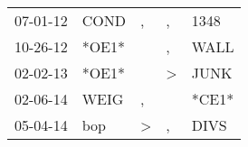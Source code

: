 \begin{supertabular}{lllll}
 07-01-12 &   COND &             , &             , &   1348 \\
 10-26-12 &  *OE1* &               &             , &   WALL \\
 02-02-13 &  *OE1* &               &  \textgreater &   JUNK \\
 02-06-14 &   WEIG &             , &               &  *CE1* \\
 05-04-14 &    bop &  \textgreater &             , &   DIVS \\
\end{supertabular}
